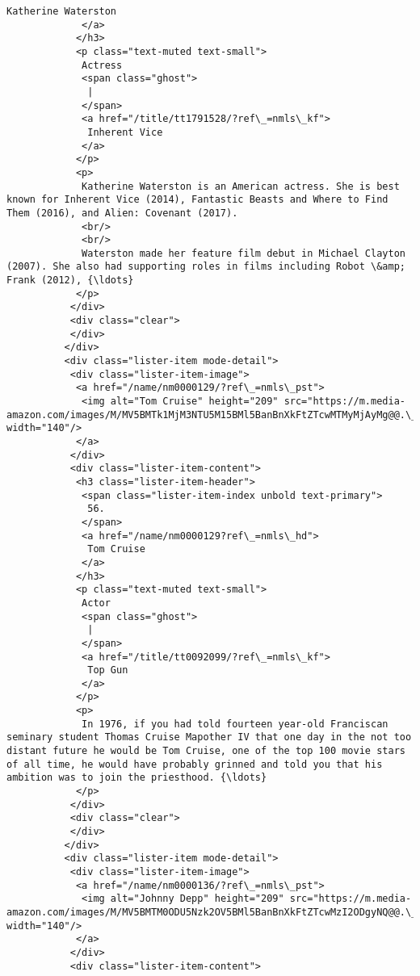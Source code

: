 \documentclass[11pt]{article}
\begin{document}
\begin{Verbatim}[commandchars=\\\{\}]
              Katherine Waterston
             </a>
            </h3>
            <p class="text-muted text-small">
             Actress
             <span class="ghost">
              |
             </span>
             <a href="/title/tt1791528/?ref\_=nmls\_kf">
              Inherent Vice
             </a>
            </p>
            <p>
             Katherine Waterston is an American actress. She is best known for Inherent Vice (2014), Fantastic Beasts and Where to Find Them (2016), and Alien: Covenant (2017).
             <br/>
             <br/>
             Waterston made her feature film debut in Michael Clayton (2007). She also had supporting roles in films including Robot \&amp; Frank (2012), {\ldots}
            </p>
           </div>
           <div class="clear">
           </div>
          </div>
          <div class="lister-item mode-detail">
           <div class="lister-item-image">
            <a href="/name/nm0000129/?ref\_=nmls\_pst">
             <img alt="Tom Cruise" height="209" src="https://m.media-amazon.com/images/M/MV5BMTk1MjM3NTU5M15BMl5BanBnXkFtZTcwMTMyMjAyMg@@.\_V1\_UY209\_CR9,0,140,209\_AL\_.jpg" width="140"/>
            </a>
           </div>
           <div class="lister-item-content">
            <h3 class="lister-item-header">
             <span class="lister-item-index unbold text-primary">
              56.
             </span>
             <a href="/name/nm0000129?ref\_=nmls\_hd">
              Tom Cruise
             </a>
            </h3>
            <p class="text-muted text-small">
             Actor
             <span class="ghost">
              |
             </span>
             <a href="/title/tt0092099/?ref\_=nmls\_kf">
              Top Gun
             </a>
            </p>
            <p>
             In 1976, if you had told fourteen year-old Franciscan seminary student Thomas Cruise Mapother IV that one day in the not too distant future he would be Tom Cruise, one of the top 100 movie stars of all time, he would have probably grinned and told you that his ambition was to join the priesthood. {\ldots}
            </p>
           </div>
           <div class="clear">
           </div>
          </div>
          <div class="lister-item mode-detail">
           <div class="lister-item-image">
            <a href="/name/nm0000136/?ref\_=nmls\_pst">
             <img alt="Johnny Depp" height="209" src="https://m.media-amazon.com/images/M/MV5BMTM0ODU5Nzk2OV5BMl5BanBnXkFtZTcwMzI2ODgyNQ@@.\_V1\_UY209\_CR3,0,140,209\_AL\_.jpg" width="140"/>
            </a>
           </div>
           <div class="lister-item-content">

\end{Verbatim}
\end{document}
